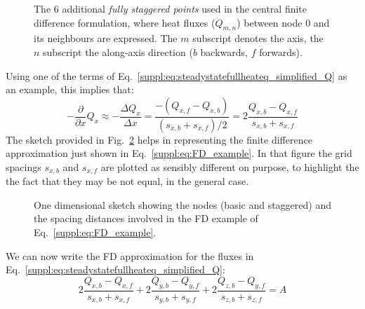 \begin{figure}[ht] %
    \begin{adjustbox}{center}
    \end{adjustbox}
    \caption[Additional (staggered) points used in the central finite difference formulation.]{The 6 additional \textit{fully staggered points} used in the central finite difference formulation, where heat fluxes ($Q_{m,n}$) between node $0$ and its neighbours are expressed.
    The $m$ subscript denotes the axis, the $n$ subscript the along-axis direction ($b$ backwards, $f$ forwards).}
    \label{suppl:fig:stencil_staggered}
\end{figure}

Using one of the terms of Eq.~\ref{suppl:eq:steadystatefullheateq_simplified_Q} as an example, this implies that:
\begin{equation}
    \label{suppl:eq:FD_example}
    - \frac{\partial}{\partial x} Q_x \approx
    - \frac{\Delta Q_x}{\Delta x} =
    \frac{-(Q_{x,f} - Q_{x,b})}{(s_{x,b} + s_{x,f}) / 2} =
    2 \frac{Q_{x,b} - Q_{x,f}}{s_{x,b} + s_{x,f}}
\end{equation}
The sketch provided in Fig.~\ref{suppl:fig:stencil_sketch} helps in representing the finite difference approximation just shown in Eq.~\ref{suppl:eq:FD_example}.
In that figure the grid spacings $s_{x,b}$ and $s_{x,f}$ are plotted as sensibly different on purpose, to highlight the the fact that they may be not equal, in the general case.

\begin{figure}[ht] %
    \begin{adjustbox}{center}
    \end{adjustbox}
    \caption[Finite differences around one node, one dimensional sketch.]{One dimensional sketch showing the nodes (basic and staggered) and the spacing distances involved in the FD example of Eq.~\ref{suppl:eq:FD_example}.}
    \label{suppl:fig:stencil_sketch}
\end{figure}

We can now write the FD approximation for the fluxes in Eq.~\ref{suppl:eq:steadystatefullheateq_simplified_Q}:
\begin{equation}
    \label{suppl:eq:FD_fluxes}
    2 \frac{Q_{x,b} - Q_{x,f}}{s_{x,b} + s_{x,f}} +
    2 \frac{Q_{y,b} - Q_{y,f}}{s_{y,b} + s_{y,f}} +
    2 \frac{Q_{z,b} - Q_{y,f}}{s_{z,b} + s_{z,f}} = A
\end{equation}

